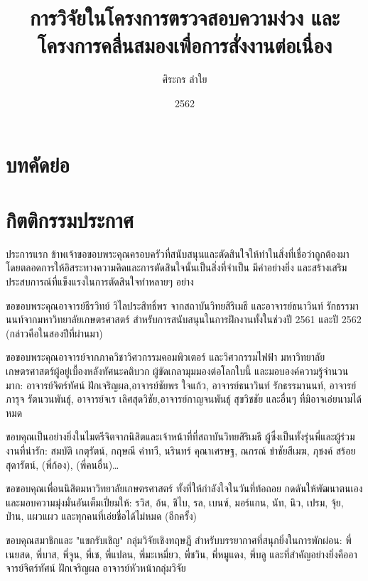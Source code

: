 \documentclass[16pt,a4]{internshipreport}
\title{การวิจัยในโครงการตรวจสอบความง่วง และโครงการคลื่นสมองเพื่อการสั่งงานต่อเนื่อง}
\date{2562}
\author{ศิระกร ลำใย}
\begin{document}
\maketitle

\chapter*{บทคัดย่อ}
\lipsum[2-4]

\chapter*{กิตติกรรมประกาศ}
ประการแรก ข้าพเจ้าขอขอบพระคุณครอบครัวที่สนับสนุนและตัดสินใจให้ทำในสิ่งที่เชื่อว่าถูกต้องมาโดยตลอดการให้อิสระทางความคิดและการตัดสินใจนั้นเป็นสิ่งที่จำเป็น มีค่าอย่างยิ่ง และสร้างเสริมประสบการณ์ที่แข็งแรงในการตัดสินใจทำหลายๆ อย่าง

ขอขอบพระคุณอาจารย์ธีรวิทย์ วิไลประสิทธิ์พร จากสถาบันวิทยสิริเมธี และอาจารย์ธนาวินท์ รักธรรมานนท์จากมหาวิทยาลัยเกษตรศาสตร์ สำหรับการสนับสนุนในการฝึกงานทั้งในช่วงปี 2561 และปี 2562 (กล่าวคือในสองปีที่ผ่านมา)

ขอขอบพระคุณอาจารย์จากภาควิชาวิศวกรรมคอมพิวเตอร์ และวิศวกรรมไฟฟ้า มหาวิทยาลัยเกษตรศาสตร์ผู้อยู่เบื้องหลังทัศนะคติบวก ผู้ขัดเกลามุมมองต่อโลกใบนี้ และมอบองค์ความรู้จำนวนมาก: อาจารย์จิตร์ทัศน์ ฝักเจริญผล,อาจารย์ชัยพร ใจแก้ว, อาจารย์ธนาวินท์ รักธรรมานนท์, อาจารย์ภารุจ รัตนวนพันธุ์, อาจารย์จเร เลิศสุดวิชัย,อาจารย์กาญจนพันธุ์ สุขวิชชัย และอื่นๆ ที่มิอาจเอ่ยนามได้หมด

ขอบคุณเป็นอย่างยิ่งในไมตรีจิตจากนิสิตและเจ้าหน้าที่ที่สถาบันวิทยสิริเมธี ผู้ซึ่งเป็นทั้งรุ่นพี่และผู้ร่วมงานที่น่ารัก: สมบัติ เกตุรัตน์, กฤษณี คำทวี, นรินทร์ คุณาเศรษฐ, ณกรณ์ ขำชัยสีเมฆ, ภุชงค์ สร้อยสุดารัตน์, (พี่ก้อง), (พี่คนอื่น)\dots

ขอขอบคุณเพื่อนนิสิตมหาวิทยาลัยเกษตรศาสตร์ ทั้งที่ให้กำลังใจในวันที่ท้อถอย
กดดันให้พัฒนาตนเอง และมอบความมุ่งมั่นอันเต็มเปี่ยมให้: รวิส, อ้น, ชิไบ, รล, เบนซ์, มอร์แกน, นัท, นิว, เปรม, จุ้ย, ป่าน, แผวแผว
และทุกคนที่เอ่ยชื่อได้ไม่หมด (อีกครั้ง)

ขอบคุณสมาชิกและ "แขกรับเชิญ" กลุ่มวิจัยเชิงทฤษฎี สำหรับบรรยากาศที่สนุกยิ่งในการพักผ่อน: พี่เนยสด, พี่บาส, พี่จูน, พี่เช, พี่แปลน, พี่มะเหมี่ยว, พี่ชวิน, พี่หมูแดง, พี่บลู
และที่สำคัญอย่างยิ่งคืออาจารย์จิตร์ทัศน์ ฝักเจริญผล อาจารย์หัวหน้ากลุ่มวิจัย
\end{document}
